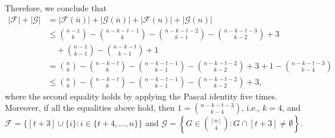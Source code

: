 \documentclass[11pt]{article}
\numberwithin{equation}{section}
\begin{document}
Therefore, we conclude that
\begin{align*}
|\mathcal{F}|+|\mathcal{G}|
&=|\mathcal{F}(\bar{n})|+|\mathcal{G}(\bar{n})|+|\mathcal{F}(n)|+|\mathcal{G}(n)| \\
& \leq\binom{n-1}{k}-\binom{n-k-t-1}{k}-\binom{n-k-t-2}{k-1}
-\binom{n-k-t-3}{k-2}+3 \\ 
& \quad +\binom{n-1}{k-1}-\binom{n-k-t}{k-1}+1\\
&=\binom{n}{k} \!-\! \binom{n-k-t}{k}\!-\!\binom{n-k-t-1}{k-1} 
\!-\! \binom{n-k-t-2}{k-2}+3+1\!-\! \binom{n-k-t-3}{k-4}\\
&\leq \binom{n}{k}-\binom{n-k-t}{k}-\binom{n-k-t-1}{k-1}-\binom{n-k-t-2}{k-2}+3,
\end{align*}
 where the second equality holds by applying the Pascal identity five times.
Moreover, if all the  equalities above  hold, then $1=\binom{n-k-t-3}{k-4}$, i.e., $k=4$, and $\mathcal{F}=\{[t+3] \cup\{i\}: i \in\{t+4, \ldots, n\}\}$ and $\mathcal{G}=\left\{G \in\binom{[n]}{4}: G \cap[t+3] \neq \emptyset\right\}$.
\end{document}
